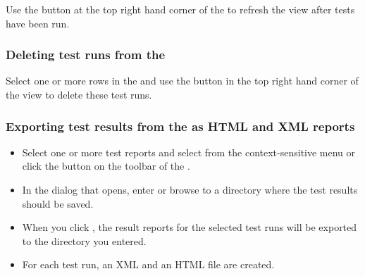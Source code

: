 Use the  button at the top right hand corner of the \gdtestsummaryview{} to refresh the view after tests have been run. 

\subsubsection{Deleting test runs from the \gdtestsummaryview{}}
\label{TestSummaryDelete}
Select one or more rows in the \gdtestsummaryview{} and use the  button in the top right hand corner of the view to delete these test runs. 


\subsubsection{Exporting test results from the \gdtestsummaryview{} as HTML and XML reports}
\label{TestSummaryExport}

\begin{itemize}
\item Select one or more test reports and select  from the context-sensitive menu or click the  button on the toolbar of the \gdtestsummaryview{}.
\item In the dialog that opens, enter or browse to a directory where the test results should be saved. 
\item When you click , the result reports for the selected test runs will be exported to the directory you entered.
\item For each test run, an XML and an HTML file are created. 
\end{itemize}


